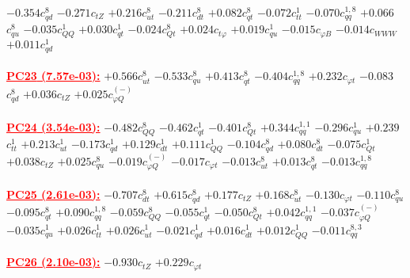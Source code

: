 \documentclass{article}
\begin{document}
{$-0.354$}{\rm $c_{qd}^{8}$}
{$-0.271$}{\rm $c_{tZ}$}
{$+0.216$}{\rm $c_{ut}^{8}$}
{$-0.211$}{\rm $c_{dt}^{8}$}
{$+0.082$}{\rm $c_{qt}^{8}$}
{$-0.072$}{\rm $c_{tt}^{1}$}
{$-0.070$}{\rm $c_{qq}^{1,8}$}
{$+0.066$}{\rm $c_{qu}^{8}$}
{$-0.035$}{\rm $c_{QQ}^{1}$}
{$+0.030$}{\rm $c_{qt}^{1}$}
{$-0.024$}{\rm $c_{Qt}^{8}$}
{$+0.024$}{\rm $c_{t \varphi}$}
{$+0.019$}{\rm $c_{qu}^{1}$}
{$-0.015$}{\rm $c_{\varphi B}$}
{$-0.014$}{\rm $c_{WWW}$}
{$+0.011$}{\rm $c_{qd}^{1}$}
 \nonumber \\ \nonumber \\
\noindent \textcolor{red}{\underline{\bf{PC23} (7.57e-03):}}
{$+0.566$}{\rm $c_{ut}^{8}$}
{$-0.533$}{\rm $c_{qu}^{8}$}
{$+0.413$}{\rm $c_{qt}^{8}$}
{$-0.404$}{\rm $c_{qq}^{1,8}$}
{$+0.232$}{\rm $c_{\varphi t}$}
{$-0.083$}{\rm $c_{qd}^{8}$}
{$+0.036$}{\rm $c_{tZ}$}
{$+0.025$}{\rm $c_{\varphi Q}^{(-)}$}
 \nonumber \\ \nonumber \\
\noindent \textcolor{red}{\underline{\bf{PC24} (3.54e-03):}}
{$-0.482$}{\rm $c_{QQ}^{8}$}
{$-0.462$}{\rm $c_{qt}^{1}$}
{$-0.401$}{\rm $c_{Qt}^{8}$}
{$+0.344$}{\rm $c_{qq}^{1,1}$}
{$-0.296$}{\rm $c_{qu}^{1}$}
{$+0.239$}{\rm $c_{tt}^{1}$}
{$+0.213$}{\rm $c_{ut}^{1}$}
{$-0.173$}{\rm $c_{qd}^{1}$}
{$+0.129$}{\rm $c_{dt}^{1}$}
{$+0.111$}{\rm $c_{QQ}^{1}$}
{$-0.104$}{\rm $c_{qd}^{8}$}
{$+0.080$}{\rm $c_{dt}^{8}$}
{$-0.075$}{\rm $c_{Qt}^{1}$}
{$+0.038$}{\rm $c_{tZ}$}
{$+0.025$}{\rm $c_{qu}^{8}$}
{$-0.019$}{\rm $c_{\varphi Q}^{(-)}$}
{$-0.017$}{\rm $c_{\varphi t}$}
{$-0.013$}{\rm $c_{ut}^{8}$}
{$+0.013$}{\rm $c_{qt}^{8}$}
{$-0.013$}{\rm $c_{qq}^{1,8}$}
 \nonumber \\ \nonumber \\
\noindent \textcolor{red}{\underline{\bf{PC25} (2.61e-03):}}
{$-0.707$}{\rm $c_{dt}^{8}$}
{$+0.615$}{\rm $c_{qd}^{8}$}
{$+0.177$}{\rm $c_{tZ}$}
{$+0.168$}{\rm $c_{ut}^{8}$}
{$-0.130$}{\rm $c_{\varphi t}$}
{$-0.110$}{\rm $c_{qu}^{8}$}
{$-0.095$}{\rm $c_{qt}^{8}$}
{$+0.090$}{\rm $c_{qq}^{1,8}$}
{$-0.059$}{\rm $c_{QQ}^{8}$}
{$-0.055$}{\rm $c_{qt}^{1}$}
{$-0.050$}{\rm $c_{Qt}^{8}$}
{$+0.042$}{\rm $c_{qq}^{1,1}$}
{$-0.037$}{\rm $c_{\varphi Q}^{(-)}$}
{$-0.035$}{\rm $c_{qu}^{1}$}
{$+0.026$}{\rm $c_{tt}^{1}$}
{$+0.026$}{\rm $c_{ut}^{1}$}
{$-0.021$}{\rm $c_{qd}^{1}$}
{$+0.016$}{\rm $c_{dt}^{1}$}
{$+0.012$}{\rm $c_{QQ}^{1}$}
{$-0.011$}{\rm $c_{qq}^{8,3}$}
 \nonumber \\ \nonumber \\
\noindent \textcolor{red}{\underline{\bf{PC26} (2.10e-03):}}
{$-0.930$}{\rm $c_{tZ}$}
{$+0.229$}{\rm $c_{\varphi t}$}
\end{document}
